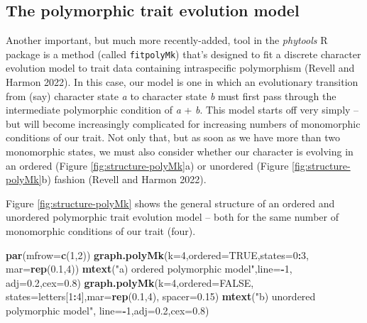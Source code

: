 \documentclass[fleqn,10pt,lineno]{wlpeerj} %
\newenvironment{Shaded}{\begin{snugshade}}{\end{snugshade}}
\newcommand{\AttributeTok}[1]{\textcolor[rgb]{0.13,0.29,0.53}{#1}}
\newcommand{\ConstantTok}[1]{\textcolor[rgb]{0.56,0.35,0.01}{#1}}
\newcommand{\DecValTok}[1]{\textcolor[rgb]{0.00,0.00,0.81}{#1}}
\newcommand{\FloatTok}[1]{\textcolor[rgb]{0.00,0.00,0.81}{#1}}
\newcommand{\FunctionTok}[1]{\textcolor[rgb]{0.13,0.29,0.53}{\textbf{#1}}}
\newcommand{\NormalTok}[1]{#1}
\newcommand{\SpecialCharTok}[1]{\textcolor[rgb]{0.81,0.36,0.00}{\textbf{#1}}}
\newcommand{\StringTok}[1]{\textcolor[rgb]{0.31,0.60,0.02}{#1}}
\begin{document}
\hypertarget{the-polymorphic-trait-evolution-model}{%
\subsection{The polymorphic trait evolution model}\label{the-polymorphic-trait-evolution-model}}

Another important, but much more recently-added, tool in the \emph{phytools} R package is a method (called \texttt{fitpolyMk}) that's designed to fit a discrete character evolution model to trait data containing intraspecific polymorphism (Revell and Harmon 2022). In this case, our model is one in which an evolutionary transition from (say) character state \emph{a} to character state \emph{b} must first pass through the intermediate polymorphic condition of \emph{a} + \emph{b}. This model starts off very simply -- but will become increasingly complicated for increasing numbers of monomorphic conditions of our trait. Not only that, but as soon as we have more than two monomorphic states, we must also consider whether our character is evolving in an ordered (Figure \ref{fig:structure-polyMk}a) or unordered (Figure \ref{fig:structure-polyMk}b) fashion (Revell and Harmon 2022).

Figure \ref{fig:structure-polyMk} shows the general structure of an ordered and unordered polymorphic trait evolution model -- both for the same number of monomorphic conditions of our trait (four).

\begin{Shaded}
\begin{Highlighting}[]
\FunctionTok{par}\NormalTok{(}\AttributeTok{mfrow=}\FunctionTok{c}\NormalTok{(}\DecValTok{1}\NormalTok{,}\DecValTok{2}\NormalTok{))}
\FunctionTok{graph.polyMk}\NormalTok{(}\AttributeTok{k=}\DecValTok{4}\NormalTok{,}\AttributeTok{ordered=}\ConstantTok{TRUE}\NormalTok{,}\AttributeTok{states=}\DecValTok{0}\SpecialCharTok{:}\DecValTok{3}\NormalTok{,}
  \AttributeTok{mar=}\FunctionTok{rep}\NormalTok{(}\FloatTok{0.1}\NormalTok{,}\DecValTok{4}\NormalTok{))}
\FunctionTok{mtext}\NormalTok{(}\StringTok{"a) ordered polymorphic model"}\NormalTok{,}\AttributeTok{line=}\SpecialCharTok{{-}}\DecValTok{1}\NormalTok{,}
  \AttributeTok{adj=}\FloatTok{0.2}\NormalTok{,}\AttributeTok{cex=}\FloatTok{0.8}\NormalTok{)}
\FunctionTok{graph.polyMk}\NormalTok{(}\AttributeTok{k=}\DecValTok{4}\NormalTok{,}\AttributeTok{ordered=}\ConstantTok{FALSE}\NormalTok{,}
  \AttributeTok{states=}\NormalTok{letters[}\DecValTok{1}\SpecialCharTok{:}\DecValTok{4}\NormalTok{],}\AttributeTok{mar=}\FunctionTok{rep}\NormalTok{(}\FloatTok{0.1}\NormalTok{,}\DecValTok{4}\NormalTok{),}
  \AttributeTok{spacer=}\FloatTok{0.15}\NormalTok{)}
\FunctionTok{mtext}\NormalTok{(}\StringTok{"b) unordered polymorphic model"}\NormalTok{,}
  \AttributeTok{line=}\SpecialCharTok{{-}}\DecValTok{1}\NormalTok{,}\AttributeTok{adj=}\FloatTok{0.2}\NormalTok{,}\AttributeTok{cex=}\FloatTok{0.8}\NormalTok{)}
\end{Highlighting}
\end{Shaded}
\end{document}
